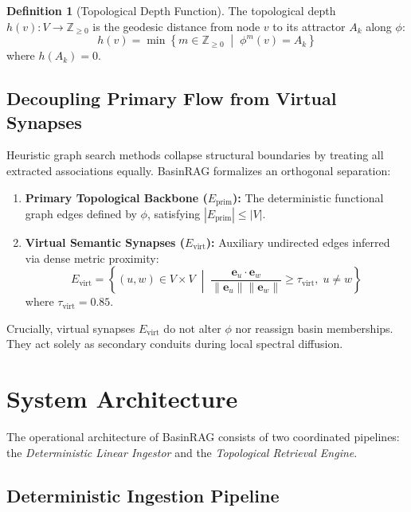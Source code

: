 \documentclass[10pt,twocolumn]{article}
\theoremstyle{definition}
\newtheorem{definition}{Definition}
\begin{document}
\begin{definition}[Topological Depth Function]
The topological depth $h(v): V \to \mathbb{Z}_{\ge 0}$ is the geodesic distance from node $v$ to its attractor $A_k$ along $\phi$:
\begin{equation}
h(v) = \min \left\{ m \in \mathbb{Z}_{\ge 0} \;\middle|\; \phi^m(v) = A_k \right\}
\end{equation}
where $h(A_k) = 0$.
\end{definition}

\subsection{Decoupling Primary Flow from Virtual Synapses}

Heuristic graph search methods collapse structural boundaries by treating all extracted associations equally. BasinRAG formalizes an orthogonal separation:
\begin{enumerate}
    \item \textbf{Primary Topological Backbone ($E_{\text{prim}}$):} The deterministic functional graph edges defined by $\phi$, satisfying $|E_{\text{prim}}| \le |V|$.
    \item \textbf{Virtual Semantic Synapses ($E_{\text{virt}}$):} Auxiliary undirected edges inferred via dense metric proximity:
    \begin{equation}
    E_{\text{virt}} = \left\{ (u, w) \in V \times V \;\middle|\; \frac{\mathbf{e}_u \cdot \mathbf{e}_w}{\|\mathbf{e}_u\| \|\mathbf{e}_w\|} \ge \tau_{\text{virt}}, \; u \ne w \right\}
    \end{equation}
    where $\tau_{\text{virt}} = 0.85$.
\end{enumerate}
Crucially, virtual synapses $E_{\text{virt}}$ do not alter $\phi$ nor reassign basin memberships. They act solely as secondary conduits during local spectral diffusion.

\section{System Architecture}

The operational architecture of BasinRAG consists of two coordinated pipelines: the \textit{Deterministic Linear Ingestor} and the \textit{Topological Retrieval Engine}.

\subsection{Deterministic Ingestion Pipeline}
\end{document}
